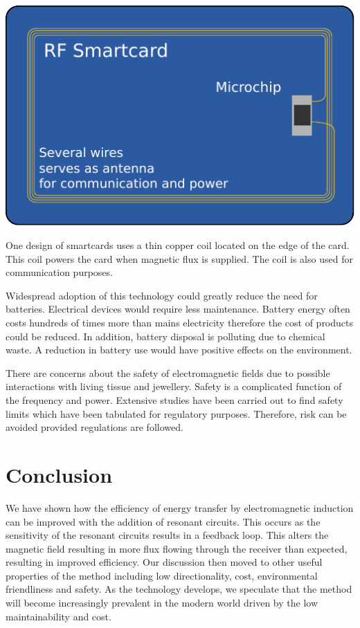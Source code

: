 \documentclass[a4paper,justified,nobib]{tufte-handout}
\begin{document}
\begin{marginfigure}
  \includegraphics[scale=0.57]{images/smartcard.pdf}
  \caption{One design of smartcards uses a thin copper coil located on the
  edge of the card.
  This coil powers the card when magnetic flux is supplied.
  The coil is also used for communication purposes.\cite{wikiRIC}}
\end{marginfigure}

Widespread adoption of this technology could greatly reduce the need for batteries.
Electrical devices would require less maintenance.
Battery energy often costs
hundreds of times more than mains electricity therefore
the cost of products could be reduced.
In addition, battery disposal is polluting due to chemical waste.
A reduction in battery use would have positive effects on the environment.
\cite{Batteries}

There are concerns about the safety of electromagnetic fields
due to possible interactions with living tissue and jewellery.
Safety is a complicated function of the frequency and power.
Extensive studies have been carried out to find safety limits which
have been tabulated for regulatory purposes.
Therefore, risk can be avoided provided regulations are followed.\cite{IEEE}

\section{Conclusion}

We have shown how the efficiency of energy transfer by electromagnetic
induction can be improved with the addition of resonant circuits.
This occurs as the sensitivity of the resonant circuits results in a feedback
loop.
This alters the magnetic field resulting in more flux flowing through the
receiver than expected, resulting in improved efficiency.
Our discussion then moved to other useful properties of the method including
low directionality, cost, environmental friendliness and safety.
As the technology develops, we speculate that the method will become
increasingly prevalent in the modern world driven by the low maintainability
and cost.




\printbibliography
\end{document}
